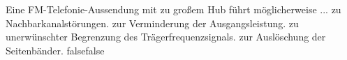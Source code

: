     {Eine FM-Telefonie-Aussendung mit zu großem Hub führt möglicherweise ...}
    {zu Nachbarkanalstörungen.}
    {zur Verminderung der Ausgangsleistung.}
    {zu unerwünschter Begrenzung des Trägerfrequenzsignals.}
    {zur Auslöschung der Seitenbänder.}
    {false}{false}